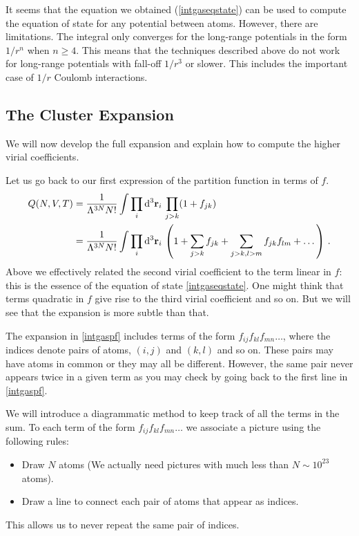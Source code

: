 \documentclass{article}
\theoremstyle{plain}\theoremheaderfont{\normalfont\bfseries}\theorembodyfont{\rmfamily}\theoremseparator{.}\newtheorem*{thm}{Theorem}\newtheorem*{law}{Law}\newtheorem*{pos}{Postulate}
\numberwithin{equation}{section}
\newcommand{\dd}[2][]{\mathrm{d}^{#1} #2\,}
\newcommand{\vb}[1]{\bm{\mathrm{#1}}}
\begin{document}
    It seems that the equation we obtained (\ref{intgaseqstate}) can be used to compute the equation of state for any potential between atoms. However, there are limitations. The integral only converges for the long-range potentials in the form \(1/r^n\) when \(n\ge 4\). This means that the techniques described above do not work for long-range potentials with fall-off \(1/r^3\) or slower. This includes the important case of \(1/r\) Coulomb interactions.

    \subsection{The Cluster Expansion}
    We will now develop the full expansion and explain how to compute the higher virial coefficients.
    
    Let us go back to our first expression of the partition function in terms of \(f\).
    \begin{align}
            Q(N,V,T)&=\frac{1}{\Lambda^{3N}N!}\int\prod_{i}\dd[3]{\vb{r}_i}\prod_{j>k}(1+f_{jk})\notag\\
            &=\frac{1}{\Lambda^{3N}N!}\int\prod_{i}\dd[3]{\vb{r}_i}\left(1+\sum_{j>k}f_{jk}+\sum_{j>k,l>m}f_{jk}f_{lm}+\dots\right)\,. \label{intgaspf}
    \end{align}
    Above we effectively related the second virial coefficient to the term linear in \(f\): this is the essence of the equation of state \cref{intgaseqstate}. One might think that terms quadratic in \(f\) give rise to the third virial coefficient and so on. But we will see that the expansion is more subtle than that.

    The expansion in \cref{intgaspf} includes terms of the form \(f_{ij}f_{kl}f_{mn}\dots\), where the indices denote pairs of atoms, \((i,j)\) and \((k,l)\) and so on. These pairs may have atoms in common or they may all be different. However, the same pair never appears twice in a given term as you may check by going back to the first line in \cref{intgaspf}.
    
    We will introduce a diagrammatic method to keep track of all the terms in the sum. To each term of the form \(f_{ij}f_{kl}f_{mn}\dots\) we associate a picture using the following rules:
    \begin{itemize}[topsep=0pt]
        \item Draw \(N\) atoms (We actually need pictures with much less than \(N\sim 10^{23}\) atoms).
        \item Draw a line to connect each pair of atoms that appear as indices.
    \end{itemize}
    This allows us to never repeat the same pair of indices.
\end{document}
